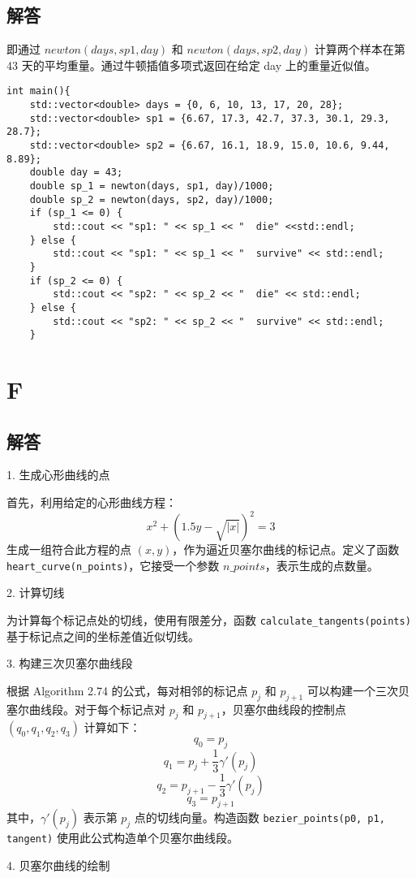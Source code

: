 \documentclass[a4paper]{article}
\begin{document}
\subsection*{解答}
即通过 $newton(days, sp1, day)$ 和 $newton(days, sp2, day)$ 计算两个样本在第 43 天的平均重量。通过牛顿插值多项式返回在给定 day 上的重量近似值。
\begin{lstlisting}
int main(){
    std::vector<double> days = {0, 6, 10, 13, 17, 20, 28};
    std::vector<double> sp1 = {6.67, 17.3, 42.7, 37.3, 30.1, 29.3, 28.7};
    std::vector<double> sp2 = {6.67, 16.1, 18.9, 15.0, 10.6, 9.44, 8.89};
    double day = 43;
    double sp_1 = newton(days, sp1, day)/1000;
    double sp_2 = newton(days, sp2, day)/1000;
    if (sp_1 <= 0) {
        std::cout << "sp1: " << sp_1 << "  die" <<std::endl;
    } else {
        std::cout << "sp1: " << sp_1 << "  survive" << std::endl;
    }
    if (sp_2 <= 0) {
        std::cout << "sp2: " << sp_2 << "  die" << std::endl;
    } else {
        std::cout << "sp2: " << sp_2 << "  survive" << std::endl;
    }
\end{lstlisting}
\section*{F}
\subsection*{解答}
1. 生成心形曲线的点

首先，利用给定的心形曲线方程：
\[
x^2 + \left(1.5y - \sqrt{|x|}\right)^2 = 3
\]
生成一组符合此方程的点 \((x, y)\)，作为逼近贝塞尔曲线的标记点。定义了函数 \texttt{heart\_curve(n\_points)}，它接受一个参数 \(n\_points\)，表示生成的点数量。

2. 计算切线

为计算每个标记点处的切线，使用有限差分，函数 \texttt{calculate\_tangents(points)} 基于标记点之间的坐标差值近似切线。

3. 构建三次贝塞尔曲线段

根据 Algorithm 2.74 的公式，每对相邻的标记点 \(p_j\) 和 \(p_{j+1}\) 可以构建一个三次贝塞尔曲线段。对于每个标记点对 \(p_j\) 和 \(p_{j+1}\)，贝塞尔曲线段的控制点 \((q_0, q_1, q_2, q_3)\) 计算如下：
\[
q_0 = p_j
\]
\[
q_1 = p_j + \frac{1}{3} \gamma'(p_j)
\]
\[
q_2 = p_{j+1} - \frac{1}{3} \gamma'(p_j)
\]
\[
q_3 = p_{j+1}
\]
其中，\(\gamma'(p_j)\) 表示第 \(p_j\) 点的切线向量。构造函数 \texttt{bezier\_points(p0, p1, tangent)} 使用此公式构造单个贝塞尔曲线段。

4. 贝塞尔曲线的绘制
\end{document}
